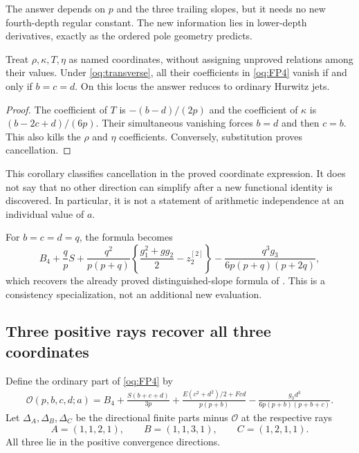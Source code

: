 The answer depends on $p$ and the three trailing slopes, but it needs
no new fourth-depth regular constant. The new information lies in
lower-depth derivatives, exactly as the ordered pole geometry predicts.

\begin{corollary}
\label{oq:locus}
Treat $\rho,\kappa,T,\eta$ as named coordinates, without assigning
unproved relations among their values. Under \eqref{oq:transverse},
all their coefficients in \eqref{oq:FP4} vanish if and only if
$b=c=d$. On this locus the answer reduces to ordinary Hurwitz jets.
\end{corollary}
\begin{proof}
The coefficient of $T$ is $-(b-d)/(2p)$ and the coefficient of
$\kappa$ is $(b-2c+d)/(6p)$. Their simultaneous vanishing forces
$b=d$ and then $c=b$. This also kills the $\rho$ and $\eta$
coefficients. Conversely, substitution proves cancellation.
\end{proof}

This corollary classifies cancellation in the proved coordinate expression.
It does not say that no other direction can simplify after a new functional
identity is discovered. In particular, it is not a statement of arithmetic
independence at an individual value of $a$.

For $b=c=d=q$, the formula becomes
\begin{equation}\label{oq:diagonalcheck}
 B_4+\frac qpS+
 \frac{q^2}{p(p+q)}\left\{\frac{g_1^2+gg_2}{2}-z_2^{[2]}\right\}
 -\frac{q^3g_3}{6p(p+q)(p+2q)},
\end{equation}
which recovers the already proved distinguished-slope formula of
\cite{RepoOrdered}. This is a consistency specialization, not an additional
new evaluation.

\subsection{Three positive rays recover all three coordinates}

Define the ordinary part of \eqref{oq:FP4} by
\begin{align}\label{oq:ordinary}
 \mathcal O(p,b,c,d;a)=B_4+
 \frac{S(b+c+d)}{3p}+
 \frac{E(c^2+d^2)/2+Fcd}{p(p+b)}
 -\frac{g_3d^3}{6p(p+b)(p+b+c)}.
\end{align}
Let $\Delta_A,\Delta_B,\Delta_C$ be the directional finite parts minus
$\mathcal O$ at the respective rays
\[
 A=(1,1,2,1),\qquad B=(1,1,3,1),\qquad C=(1,2,1,1).
\]
All three lie in the positive convergence directions.

